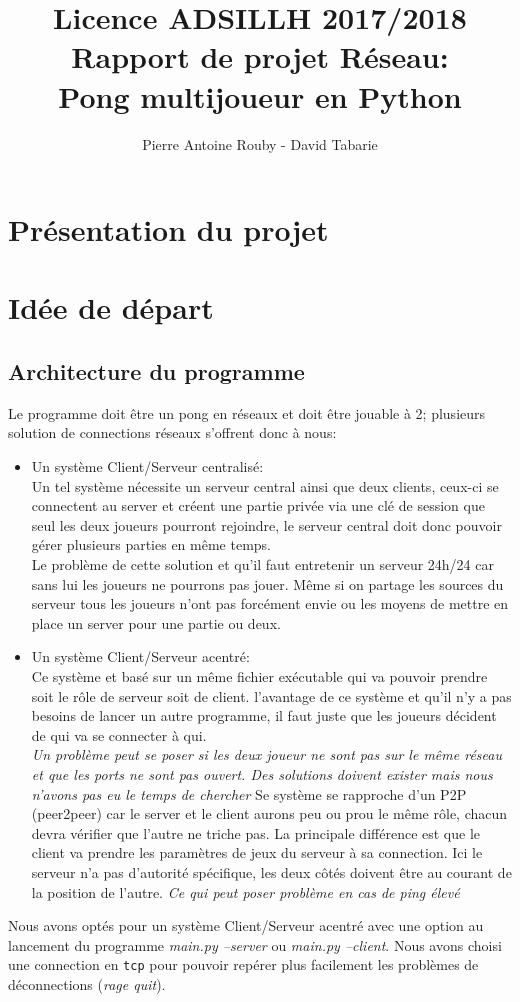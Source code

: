 \documentclass[12pt]{report}
\title{Licence ADSILLH 2017/2018\\Rapport de projet Réseau:\\Pong
  multijoueur en Python}
\author{Pierre Antoine Rouby - David Tabarie\newline}
\date{}
\begin{document}
\maketitle

\begin{abstract}
\end{abstract}
\tableofcontents

\part{Présentation du projet}

\part{Idée de départ}
\chapter{Architecture du programme}
Le programme doit être un pong en réseaux et doit être jouable à 2;
plusieurs solution de connections réseaux s'offrent donc à nous:
\begin{itemize}
\item Un système Client/Serveur centralisé: \\
  Un tel système nécessite un serveur central ainsi que deux clients, ceux-ci se
  connectent au server et créent une partie privée via une clé de
  session que seul les deux joueurs pourront rejoindre, le serveur
  central doit donc pouvoir gérer plusieurs parties en même temps. \\
  Le problème de cette solution et qu'il faut entretenir un serveur 24h/24
  car sans lui les joueurs ne pourrons pas jouer.
  Même si on partage les sources du serveur tous les joueurs n'ont pas forcément
  envie ou les moyens de mettre en place un server pour une partie ou deux.
\item Un système Client/Serveur acentré: \\
  Ce système et basé sur un même fichier exécutable qui va pouvoir prendre
  soit le rôle de serveur soit de client. l'avantage de ce système et qu'il n'y
  a pas besoins de lancer un autre programme, il faut juste que les
  joueurs décident de qui va se connecter à qui. \\
  \textit{Un problème peut se poser si les deux joueur ne sont pas sur le même
    réseau et que les ports ne sont pas ouvert. Des solutions doivent exister
    mais nous n'avons pas eu le temps de chercher}
  Se système se rapproche d'un P2P (peer2peer) car le server et le client
  aurons peu ou prou le même rôle, chacun devra vérifier que l'autre ne triche
  pas. La principale différence est que le client va prendre les paramètres de
  jeux du serveur à sa connection.
  Ici le serveur n'a pas d'autorité spécifique, les deux côtés doivent être au
  courant de la position de l'autre.
  \textit{Ce qui peut poser problème en cas de ping élevé}
\end{itemize}
Nous avons optés pour un système Client/Serveur acentré avec une option au
lancement du programme \textit{main.py --server} ou \textit{main.py --client}.
Nous avons choisi une connection en \texttt{tcp} pour pouvoir repérer plus
facilement les problèmes de déconnections (\textit{rage quit}).
\end{document}
